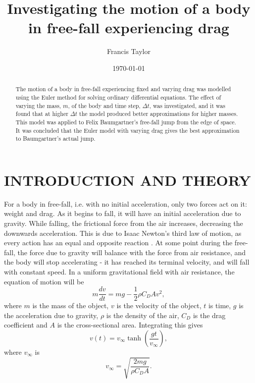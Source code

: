 \documentclass[twocolumn,prl,nobalancelastpage,aps,10pt]{revtex4-1}
\begin{document}
\title{Investigating the motion of a body in free-fall experiencing drag}

\author{Francis Taylor}


\begin{abstract}The motion of a body in free-fall experiencing fixed and varying drag was modelled using the Euler method for solving ordinary differential equations. The effect of varying the mass, $m$, of the body and time step, $\Delta t$, was investigated, and it was found that at higher $\Delta t$ the model produced better approximations for higher masses. This model was applied to Felix Baumgartner's free-fall jump from the edge of space. It was concluded that the Euler model with varying drag gives the best approximation to Baumgartner's actual jump.
\end{abstract}
\date{\today}

\maketitle

\section{INTRODUCTION AND THEORY}


For a body in free-fall, i.e. with no initial acceleration, only two forces act on it: weight and drag. As it begins to fall, it will have an initial acceleration due to gravity. While falling, the frictional force from the air increases, decreasing the downwards acceleration. This is due to Isaac Newton's third law of motion, as every action has an equal and opposite reaction \cite{Newton1846}. At some point during the free-fall, the force due to gravity will balance with the force from air resistance, and the body will stop accelerating - it has reached its terminal velocity, and will fall with constant speed. In a uniform gravitational field with air resistance, the equation of motion will be
\begin{equation}\label{eq-motion}
m\frac{dv}{dt} = mg - \frac{1}{2}\rho C_{D}Av^{2},
\end{equation}
where $m$ is the mass of the object, $v$ is the velocity of the object, $t$ is time, $g$ is the acceleration due to gravity, $\rho$ is the density of the air, $C_{D}$ is the drag coefficient and $A$ is the cross-sectional area. Integrating this gives
\begin{equation}\label{eq-v}
v(t) = v_{\infty}\tanh(\frac{gt}{v_{\infty}}),
\end{equation}
where $v_{\infty}$ is
\begin{equation}\label{eq-terminal-v}
v_{\infty} = \sqrt{\frac{2mg}{\rho C_{D} A}}.
\end{equation}
\end{document}
